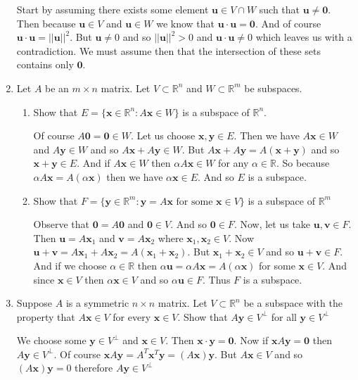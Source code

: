 \documentclass[letterpaper]{article}
\begin{document}
\begin{enumerate}
Start by assuming there exists some element  $\mathbf{u}\in V\cap W$ such that $\mathbf{u}\ne \mathbf{0}$.
Then because $\mathbf{u}\in V$ and $\mathbf{u}\in W$ we know that $\mathbf{u}\cdot\mathbf{u}=\mathbf{0}$.
And of course $\mathbf{u}\cdot\mathbf{u}=||\mathbf{u}||^2$.
But $\mathbf{u}\ne 0$ and so $||\mathbf{u}||^2>0$ and $\mathbf{u}\cdot\mathbf{u}\ne 0$ which leaves us with a contradiction.
We must assume then that the intersection of these sets contains only $\mathbf{0}$.
\setcounter{enumi}{14}
\item
Let $A$ be an $m\times n$ matrix. Let $V\subset \mathbb{R}^n$ and $W\subset \mathbb{R}^m$ be subspaces.
  \begin{enumerate}
  \item
  Show that $E=\{\mathbf{x}\in \mathbb{R}^n:A\mathbf{x}\in W\}$ is a subspace of $\mathbb{R}^n$.

  Of course $A\mathbf{0}=\mathbf{0}\in W$. Let us choose $\mathbf{x},\mathbf{y}\in E$. Then we have $A\mathbf{x}\in W$ and $A\mathbf{y}\in W$ and so $A\mathbf{x}+A\mathbf{y}\in W$. But $A\mathbf{x}+A\mathbf{y}=A(\mathbf{x}+\mathbf{y})$ and so $\mathbf{x}+\mathbf{y}\in E$. And if $A\mathbf{x}\in W$ then $\alpha A\mathbf{x}\in W$ for any $\alpha\in \mathbb{R}$. So because $\alpha A\mathbf{x}=A(\alpha\mathbf{x})$ then we have $\alpha\mathbf{x}\in E$. And so $E$ is a subspace.
  \item
  Show that $F=\{\mathbf{y}\in \mathbb{R}^m:\mathbf{y}=A\mathbf{x}\text{ for some }\mathbf{x}\in V\}$ is a subspace of $\mathbb{R}^m$

  Observe that $\mathbf{0}=A\mathbf{0}$ and $\mathbf{0}\in V$. And so $\mathbf{0}\in F$. Now, let us take $\mathbf{u},\mathbf{v}\in F$. Then $\mathbf{u}=A\mathbf{x}_1$ and $\mathbf{v}=A\mathbf{x}_2$ where $\mathbf{x}_1,\mathbf{x}_2\in V$. Now $\mathbf{u}+\mathbf{v}=A\mathbf{x}_1+A\mathbf{x}_2=A(\mathbf{x}_1+\mathbf{x}_2)$. But $\mathbf{x}_1+\mathbf{x}_2\in V$ and so $\mathbf{u}+\mathbf{v}\in F$. And if we choose $\alpha\in \mathbb{R}$ then $\alpha\mathbf{u}=\alpha A\mathbf{x}=A(\alpha\mathbf{x})$ for some $\mathbf{x}\in V$. And since $\mathbf{x}\in V$ then $\alpha\mathbf{x}\in V$ and so $\alpha\mathbf{u}\in F$. Thus $F$ is a subspace.
  \end{enumerate}
\item
Suppose $A$ is a symmetric $n\times n$ matrix. Let $V\subset \mathbb{R}^n$ be a  subspace with the property that $A\mathbf{x}\in V$ for every $\mathbf{x}\in V$. Show that $A\mathbf{y}\in V^\perp$ for all $\mathbf{y}\in V^\perp$

We choose some $\mathbf{y}\in V^\perp$ and $\mathbf{x}\in V$. Then $\mathbf{x}\cdot\mathbf{y}=\mathbf{0}$. Now if $\mathbf{x}A\mathbf{y}=\mathbf{0}$ then $A\mathbf{y}\in V^\perp$. Of course $\mathbf{x}A\mathbf{y}=A^T\mathbf{x}^T\mathbf{y}=(A\mathbf{x})\mathbf{y}$. But $A\mathbf{x}\in V$ and so $(A\mathbf{x})\mathbf{y}=0$ therefore $A\mathbf{y}\in V^\perp$
\end{enumerate}
\end{document}
